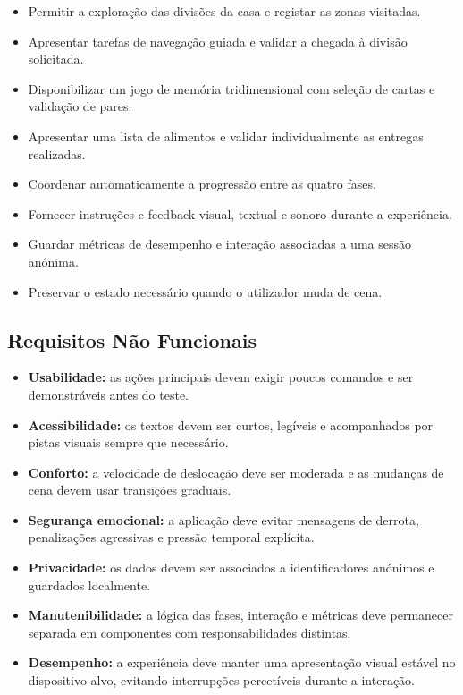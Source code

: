 \documentclass[12pt,a4paper,oneside]{report}
\begin{document}
\begin{itemize}
    \item Permitir a exploração das divisões da casa e registar as zonas visitadas.
    \item Apresentar tarefas de navegação guiada e validar a chegada à divisão solicitada.
    \item Disponibilizar um jogo de memória tridimensional com seleção de cartas e validação de pares.
    \item Apresentar uma lista de alimentos e validar individualmente as entregas realizadas.
    \item Coordenar automaticamente a progressão entre as quatro fases.
    \item Fornecer instruções e feedback visual, textual e sonoro durante a experiência.
    \item Guardar métricas de desempenho e interação associadas a uma sessão anónima.
    \item Preservar o estado necessário quando o utilizador muda de cena.
\end{itemize}

\subsection{Requisitos Não Funcionais}

\begin{itemize}
    \item \textbf{Usabilidade:} as ações principais devem exigir poucos comandos e ser demonstráveis antes do teste.
    \item \textbf{Acessibilidade:} os textos devem ser curtos, legíveis e acompanhados por pistas visuais sempre que necessário.
    \item \textbf{Conforto:} a velocidade de deslocação deve ser moderada e as mudanças de cena devem usar transições graduais.
    \item \textbf{Segurança emocional:} a aplicação deve evitar mensagens de derrota, penalizações agressivas e pressão temporal explícita.
    \item \textbf{Privacidade:} os dados devem ser associados a identificadores anónimos e guardados localmente.
    \item \textbf{Manutenibilidade:} a lógica das fases, interação e métricas deve permanecer separada em componentes com responsabilidades distintas.
    \item \textbf{Desempenho:} a experiência deve manter uma apresentação visual estável no dispositivo-alvo, evitando interrupções percetíveis durante a interação.
\end{itemize}
\end{document}
